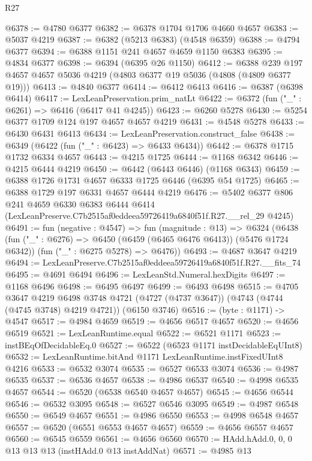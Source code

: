 \begin{lexlean}{R27}
\begin{coremodule}
@6378 := @4780 @6377
@6382 := @6378 @1704 @1706 @4660 @4657
@6383 := @5037 @4219
@6387 := @6382 (@5213 @6383) (@4548 @6359)
@6388 := @4794 @6377
@6394 := @6388 @1151 @241 @4657 @4659 @1150 @6383
@6395 := @4834 @6377
@6398 := @6394 (@6395 @26 @1150)
@6412 := @6388 @239 @197 @4657 @4657 @5036 @4219 (@4803 @6377 @19 @5036 (@4808 (@4809 @6377 @19)))
@6413 := @4840 @6377
@6414 := @6412 @6413
@6416 := @6387 (@6398 @6414)
@6417 := LexLeanPreservation.prim_natLt
@6422 := @6372 (fun ("_" : @6261) => @6416 (@6417 @41 @4245))
@6423 := @6260 @5278
@6430 := @5254 @6377 @1709 @124 @197 @4657 @4657 @4219
@6431 := @4548 @5278
@6433 := @6430 @6431 @6413
@6434 := LexLeanPreservation.construct_false
@6438 := @6349 (@6422 (fun ("_" : @6423) => @6433 @6434))
@6442 := @6378 @1715 @1732 @6334 @4657
@6443 := @4215 @1725
@6444 := @1168 @6342
@6446 := @4215 @6444 @4219
@6450 := @6442 (@6443 @6446) (@1168 @6343)
@6459 := @6388 @1726 @1731 @4657 @6333 @1725 @6446 (@6395 @54 @1725)
@6465 := @6388 @1729 @197 @6331 @4657 @6444 @4219
@6476 := @5402
    @6377
    @806
    @241
    @4659
    @6330
    @6383
    @6444
    @6414
    (LexLeanPreserve.C7b2515af0eddeea59726419a6840f51f.R27.__rel_29 @4245)
@6491 := fun (negative : @4547) =>
  fun (magnitude : @13) =>
  @6324
    (@6438
      (fun ("_" : @6276) => @6450 (@6459 (@6465 @6476 @6413)) (@5476 @1724 @6342))
      (fun ("_" : @6275 @5278) => @6476))
@6493 := @4687 @3647 @4219
@6494 := LexLeanPreserve.C7b2515af0eddeea59726419a6840f51f.R27.__fits_74
@6495 := @4691 @6494
@6496 := LexLeanStd.Numeral.hexDigits
@6497 := @1168 @6496
@6498 := @6495 @6497
@6499 := @6493 @6498
@6515 := @4705
    @3647
    @4219
    @6498
    @3748
    @4721
    (@4727 (@4737 @3647))
    (@4743 (@4744 (@4745 @3748) @4219 @4721))
    (@6150 @3746)
@6516 := (byte : @1171) -> @4547
@6517 := @4984 @4659
@6519 := @4656 @6517 @4657
@6520 := @4656 @6519
@6521 := LexLeanRuntime.equal
@6522 := @6521 @1171
@6523 := instBEqOfDecidableEq.{0}
@6527 := @6522 (@6523 @1171 instDecidableEqUInt8)
@6532 := LexLeanRuntime.bitAnd @1171 LexLeanRuntime.instFixedUInt8 @4216
@6533 := @6532 @3074
@6535 := @6527 @6533 @3074
@6536 := @4987 @6535
@6537 := @6536 @4657
@6538 := @4986 @6537
@6540 := @4998 @6535 @4657
@6544 := @6520 (@6538 @6540 @4657 @4657)
@6545 := @4656 @6544
@6546 := @6532 @3095
@6548 := @6527 @6546 @3095
@6549 := @4987 @6548
@6550 := @6549 @4657
@6551 := @4986 @6550
@6553 := @4998 @6548 @4657
@6557 := @6520 (@6551 @6553 @4657 @4657)
@6559 := @4656 @6557 @4657
@6560 := @6545 @6559
@6561 := @4656 @6560
@6570 := HAdd.hAdd.{0, 0, 0} @13 @13 @13 (instHAdd.{0} @13 instAddNat)
@6571 := @4985 @13

\end{coremodule}
\end{lexlean}
